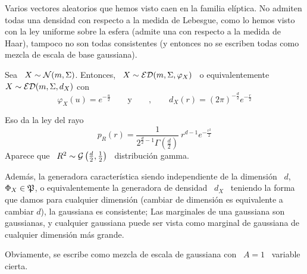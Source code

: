 Varios vectores  aleatorios que hemos visto  caen en la  familia el\'iptica.  No
admiten todas una  densidad con respecto a la medida de  Lebesgue, como lo hemos
visto con la ley  uniforme sobre la esfera (admite una con  respecto a la medida
de Haar),  tampoco no son  todas consistentes (y  entonces no se  escriben todas
como mezcla de escala de base gaussiana).
%
\begin{ejemplo}
%
  Sea \ $X \sim \mathcal{N}(m,\Sigma)$.  Entonces, \ $X \sim \mathcal{ED}(m,\Sigma,\varphi_X)$ \ o
  equivalentemente \ $X \sim \mathcal{ED}(m,\Sigma,d_X)$ con
  \[
  \varphi_X(u) =  e^{-\frac{u}{2}} \qquad \mbox{y}  \qquad , \qquad d_X(r)  = (2
  \pi)^{-\frac{d}{2}} e^{- \frac{r}{2}}
  \]
  
  Eso da la ley del rayo
  \[
  p_R(r)  =  \frac{1}{2^{\frac{d}{2}-1}  \Gamma\left(  \frac{d}{2}  \right)}  \:
  r^{d-1} e^{- \frac{r^2}{2}}
  \]
  Aparece   que  \   $R^2  \sim   \mathcal{G}\left(  \frac{d}{2}   ,   \frac12\right)$  \
  distribuci\'on gamma.
  
  Adem\'as,   la  generadora   caracter\'istica  siendo   independiente   de  la
  dimensi\'on \  $d$, \  $\Phi_X \in \mathfrak{P}$,  o equivalentemente la  generadora de
  densidad  \ $d_X$ \  teniendo la  forma que  damos para  cualquier dimensi\'on
  (cambiar  de  dimensi\'on es  equivalente  a  cambiar  $d$), la  gaussiana  es
  consistente;  Las marginales  de  una gaussiana  son  gaussianas, y  cualquier
  gaussiana puede ser vista como  marginal de gaussiana de cualquier dimensi\'on
  m\'as grande.

  Obviamente, se  escribe como mezcla  de escala  de gaussiana con  \ $A =  1$ \
  variable cierta.
\end{ejemplo}

